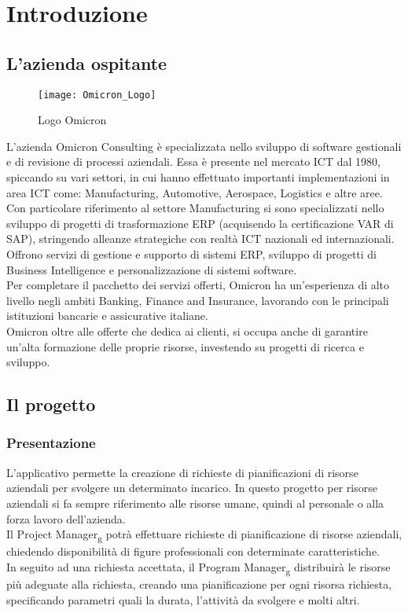 \chapter{Introduzione}
\label{cap:introduzione}

\section{L'azienda ospitante}

\begin{figure}[!h] 
    \centering 
    \texttt{[image: Omicron\_Logo]} 
    \caption{Logo Omicron}
\end{figure}

\noindent L’azienda Omicron Consulting è specializzata nello sviluppo di software gestionali e di revisione di processi aziendali. Essa è presente nel mercato ICT dal 1980, spiccando su vari settori, in cui hanno effettuato importanti implementazioni in area ICT come:  Manufacturing, Automotive, Aerospace, Logistics e altre aree.
Con particolare riferimento al settore Manufacturing si sono specializzati nello sviluppo di progetti di trasformazione ERP (acquisendo la certificazione VAR di SAP), stringendo alleanze strategiche con realtà ICT nazionali ed internazionali.\\
Offrono servizi di gestione e supporto di sistemi ERP, sviluppo di progetti di Business Intelligence e personalizzazione di sistemi software.\\
Per completare il pacchetto dei servizi offerti, Omicron ha un'esperienza di alto livello negli ambiti Banking, Finance and Insurance, lavorando con le principali istituzioni bancarie e assicurative italiane.\\
Omicron oltre alle offerte che dedica ai clienti, si occupa anche di garantire un'alta formazione delle proprie risorse, investendo su progetti di ricerca e sviluppo.

\section{Il progetto}
\subsection{Presentazione}
L'applicativo permette la creazione di richieste di pianificazioni di risorse aziendali per svolgere un determinato incarico. In questo progetto per risorse aziendali si fa sempre riferimento alle risorse umane, quindi al personale o alla forza lavoro dell'azienda.\\
Il Project Manager\textsubscript{g} potrà effettuare richieste di pianificazione di risorse aziendali, chiedendo disponibilità di figure professionali con determinate caratteristiche.\\ 
In seguito ad una richiesta accettata, il Program Manager\textsubscript{g} distribuirà le risorse più adeguate alla richiesta, creando una pianificazione per ogni risorsa richiesta, specificando parametri quali la durata, l'attività da svolgere e molti altri.\\

